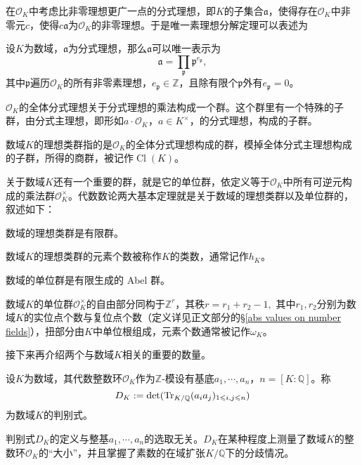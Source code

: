 在$\mathcal{O}_K$中考虑比非零理想更广一点的分式理想，即$K$的子集合$\mathfrak{a}$，使得存在$\mathcal{O}_K$中非零元$c$，使得$c\mathfrak{a}$为$\mathcal{O}_K$的非零理想。于是唯一素理想分解定理可以表述为
\begin{theorem}
设$K$为数域，$\mathfrak{a}$为分式理想，那么$\mathfrak{a}$可以唯一表示为
\begin{equation}
\mathfrak{a} = \prod\limits_{\mathfrak{p}} \mathfrak{p}^{e_{\mathfrak{p}}},
\end{equation}
其中$\mathfrak{p}$遍历$\mathcal{O}_K$的所有非零素理想，$e_{\mathfrak{p}}\in\mathbb{Z}$，且除有限个$\mathfrak{p}$外有$e_{\mathfrak{p}} = 0$。
\end{theorem}

$\mathcal{O}_K$的全体分式理想关于分式理想的乘法构成一个群。这个群里有一个特殊的子群，由分式主理想，即形如$a\cdot\mathcal{O}_K$，$a\in K^{\times}$，的分式理想，构成的子群。

\begin{definition}
数域$K$的理想类群指的是$\mathcal{O}_K$的全体分式理想构成的群，模掉全体分式主理想构成的子群，所得的商群，被记作$\operatorname{Cl}(K)$。
\end{definition}

关于数域$K$还有一个重要的群，就是它的单位群，依定义等于$\mathcal{O}_K$中所有可逆元构成的乘法群$\mathcal{O}_K^{\times}$。代数数论两大基本定理就是关于数域的理想类群以及单位群的，叙述如下：

\begin{theorem}[类数有限定理]
数域的理想类群是有限群。
\end{theorem}
数域$K$的理想类群的元素个数被称作$K$的类数，通常记作$h_K$。

\begin{theorem}
数域的单位群是有限生成的 Abel 群。
\end{theorem}
数域$K$的单位群$\mathcal{O}_K^{\times}$的自由部分同构于$\mathbb{Z}^r$，其秩$r = r_1 + r_2 - 1,$ 其中$r_1, r_2$分别为数域$K$的实位点个数与复位点个数（定义详见正文部分的\S \ref{abs values on number fields}），扭部分由$K$中单位根组成，元素个数通常被记作$\omega_K$。

接下来再介绍两个与数域$K$相关的重要的数量。
\begin{definition} \label{number field discriminant}
设$K$为数域，其代数整数环$\mathcal{O}_K$作为$\mathbb{Z}$-模设有基底$a_1,\cdots,a_n$，$n = [K:\mathbb{Q}]$。称
\begin{equation}
D_K := \det(\operatorname{Tr}_{K/\mathbb{Q}}(a_ia_j)_{1\leqslant i,j \leqslant n})
\end{equation}
为数域$K$的判别式。
\end{definition}
判别式$D_K$的定义与整基$a_1,\cdots,a_n$的选取无关。$D_K$在某种程度上测量了数域$K$的整数环$\mathcal{O}_K$的``大小''，并且掌握了素数的在域扩张$K/\mathbb{Q}$下的分歧情况。

